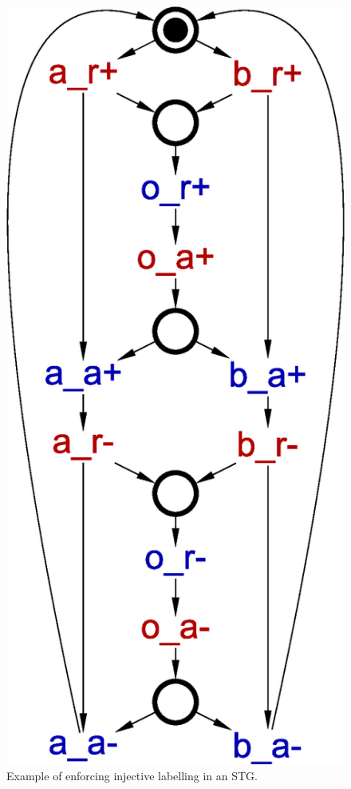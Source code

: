 \begin{figure}[!tb]
    \hfill%
    \includegraphics[scale=0.3]{EXPERIMENTS/stg/mix_full_inj}%
    \hfill%
    {}
    \caption{\label{fi-enforce-inj}
        Example of enforcing injective labelling in an STG.
    }
\end{figure}
